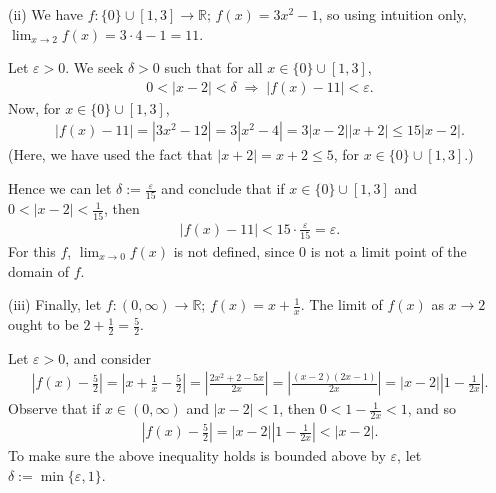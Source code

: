 \documentclass[letterpaper,10pt,english]{jupyterBook}
\begin{document}
\sphinxAtStartPar
(ii) We have \(f:\{0\}\cup[1,3]\to\mathbb{R}\); \(f(x)=3x^2-1\), so using intuition only, \(\lim_{x\rightarrow 2} f(x)=3\cdot 4-1=11\).

\sphinxAtStartPar
Let \(\varepsilon>0\). We seek \(\delta>0\) such that for all \(x\in\{0\}\cup[1,3]\),
\begin{equation*}
\begin{split}
0<|x-2|<\delta \; \Rightarrow \; |f(x)-11|<\varepsilon.
\end{split}
\end{equation*}
\sphinxAtStartPar
Now, for \(x\in\{0\}\cup[1,3]\),
\begin{equation*}
\begin{split}
|f(x)-11| = |3x^2-12| = 3|x^2-4| = 3|x-2||x+2| \leq 15|x-2|.
\end{split}
\end{equation*}
\sphinxAtStartPar
(Here, we have used the fact that \(|x+2| = x+2 \leq 5\), for \(x\in\{0\}\cup[1,3]\).)

\sphinxAtStartPar
Hence we can let \(\delta:=\frac{\varepsilon}{15}\) and conclude that if \(x\in\{0\}\cup[1,3]\) and \(0<|x-2|<\frac{1}{15}\), then
\begin{equation*}
\begin{split}
|f(x)-11|<15\cdot\frac{\varepsilon}{15} =\varepsilon.
\end{split}
\end{equation*}
\sphinxAtStartPar
For this \(f\), \(\lim_{x\rightarrow 0}f(x)\) is not defined, since \(0\) is not a limit point of the domain of \(f\).

\label{\detokenize{Solutions-upto46:iiisol}}
\sphinxAtStartPar
(iii) Finally, let \(f:(0,\infty)\to\mathbb{R}\); \(f(x)=x+\frac{1}{x}\). The limit of \(f(x)\) as \(x\rightarrow 2\) ought to be \(2+\frac{1}{2}=\frac{5}{2}\).

\sphinxAtStartPar
Let \(\varepsilon>0\), and consider
\begin{equation*}
\begin{split}
\left|f(x)-\frac{5}{2}\right| = \left|x+\frac{1}{x}-\frac{5}{2}\right| = \left|\frac{2x^2+2-5x}{2x}\right| = \left|\frac{(x-2)(2x-1)}{2x}\right| = |x-2|\left|1-\frac{1}{2x}\right|.
\end{split}
\end{equation*}
\sphinxAtStartPar
Observe that if \(x\in(0,\infty)\) and \(|x-2|<1\), then \(0<1-\frac{1}{2x}<1\), and so
\begin{equation*}
\begin{split}
\left|f(x)-\frac{5}{2}\right| = |x-2|\left|1-\frac{1}{2x}\right| < |x-2|.
\end{split}
\end{equation*}
\sphinxAtStartPar
To make sure the above inequality holds  is bounded above by \(\varepsilon\), let \(\delta:=\min\{\varepsilon,1\}\).
\end{document}
